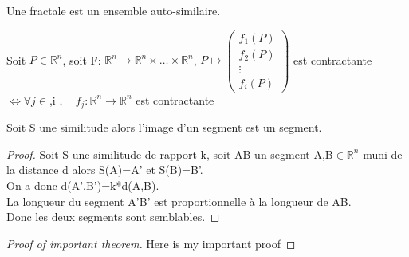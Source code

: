 \documentclass[a4paper, 12pt]{report}
\begin{document}
\begin{definition}
	Une fractale est un ensemble auto-similaire.
\end{definition}

\begin{definition}
	
	  Soit $P\in\mathbb{R}^n$, soit F: $\mathbb{R}^n\longrightarrow \mathbb{R}^n\times\ldots\times\mathbb{R}^n$,
	      $P\longmapsto\begin{pmatrix}
	      f_{1}(P)	 \\
	      f_{2}(P)	 \\
	      \vdots \\
	      f_{i}(P) 
	      \end{pmatrix}$ 
	      est contractante $\Longleftrightarrow \forall j \in $,i \textrbrackdbl$, \quad f_j:\mathbb{R}^n \longrightarrow \mathbb{R}^n$ est contractante
	
	
\end{definition}

\begin{definition}
	Soit S une similitude alors l'image d'un segment est un segment.
\end{definition}


\begin{proof}
 Soit S une similitude de rapport k, soit AB un segment A,B$\in\mathbb{R}^n$ muni de la distance d alors S(A)=A' et S(B)=B'.\\
 On a donc d(A',B')=k*d(A,B).\\
 La longueur du segment A'B' est proportionnelle à la longueur de AB.\\
 Donc les deux segments sont semblables.
\end{proof}

\begin{proof}[Proof of important theorem]
Here is my important proof
\end{proof}
\end{document}
